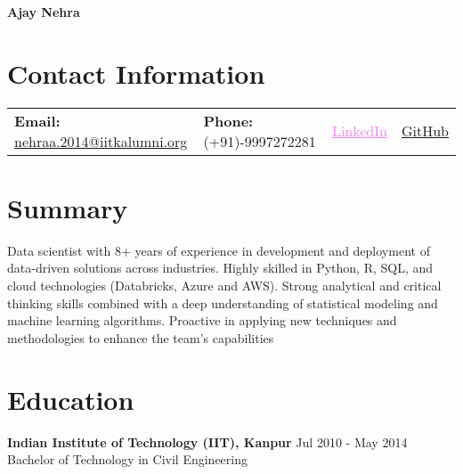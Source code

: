 \documentclass[a4paper,10pt]{article}
\begin{document}
\begin{center}
    \textbf{\huge Ajay Nehra}
\end{center}

%

\section*{Contact Information}
\noindent
\begin{tabular*}{\linewidth}{@{\extracolsep{\fill}}lllr@{}}
    \textbf{Email:} \href{mailto:nehraa.2014@iitkalumni.org}{nehraa.2014@iitkalumni.org} &
    \textbf{Phone:} (+91)-9997272281 &
    \href{https://www.linkedin.com/in/ajay-n-575bba23/}{\textcolor{violet}{\underline{LinkedIn}}} &
    \href{https://github.com/ajaynehra}{\textcolor{black!60!green}{\underline{GitHub}}}
\end{tabular*}





\section*{Summary}
Data scientist with 8+ years of experience in development and deployment of data-driven solutions across industries. Highly skilled in Python, R, SQL, and cloud technologies (Databricks, Azure and AWS). Strong analytical and critical thinking skills combined with a deep understanding of statistical modeling and machine learning algorithms. Proactive in  applying new techniques and methodologies to enhance the team's capabilities


\section*{Education}
\textbf{Indian Institute of Technology (IIT), Kanpur} \hfill \textnormal{Jul 2010 - May 2014} \\
Bachelor of Technology in Civil Engineering

\end{document}
